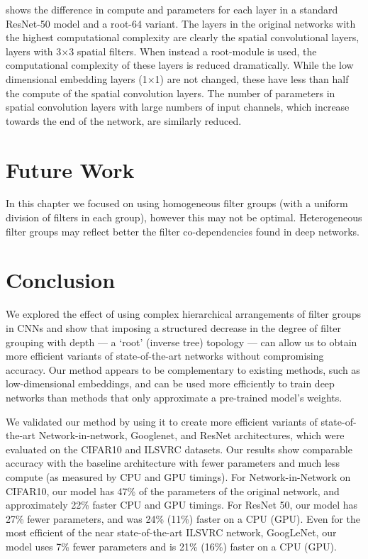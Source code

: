 \documentclass[thesis]{subfiles}
\begin{document}
	 shows the difference in compute and parameters for each layer in a standard ResNet-50 model and a root-64 variant. The layers in the original networks with the highest computational complexity are clearly the spatial convolutional layers, \ie layers with 3$\times$3 spatial filters. When instead a root-module is used, the computational complexity of these layers is reduced dramatically. While the low dimensional embedding layers (1$\times$1) are not changed, these have less than half the compute of the spatial convolution layers. The number of parameters in spatial convolution layers with large numbers of input channels, which increase towards the end of the network, are similarly reduced.
	
	\section{Future Work} 
	In this chapter we focused on using homogeneous filter groups (with a uniform division of filters in each group), however this may not be optimal. Heterogeneous filter groups may reflect better the filter co-dependencies found in deep networks. %
	
	\section{Conclusion}
	We explored the effect of using complex hierarchical arrangements of filter groups in CNNs and show that imposing a structured decrease in the degree of filter grouping with depth --- a `root' (inverse tree) topology --- can allow us to obtain more efficient variants of state-of-the-art networks without compromising accuracy. Our method appears to be complementary to existing methods, such as low-dimensional embeddings, and can be used more efficiently to train deep networks than methods that only approximate a pre-trained model's weights.
	
	We validated our method by using it to create more efficient variants of state-of-the-art Network-in-network, Googlenet, and ResNet architectures, which were evaluated on the CIFAR10 and ILSVRC datasets. Our results show comparable accuracy with the baseline architecture with fewer parameters and much less compute (as measured by CPU and GPU timings). For Network-in-Network on CIFAR10, our model has 47\% of the parameters of the original network, and approximately 22\% faster CPU and GPU timings. For ResNet 50, our model has 27\% fewer parameters, and was 24\% (11\%) faster on a CPU (GPU). 
	Even for the most efficient of the near state-of-the-art ILSVRC network, GoogLeNet, our model uses 7\% fewer parameters and is 21\% (16\%) faster on a CPU (GPU).
	
	
\end{document}
